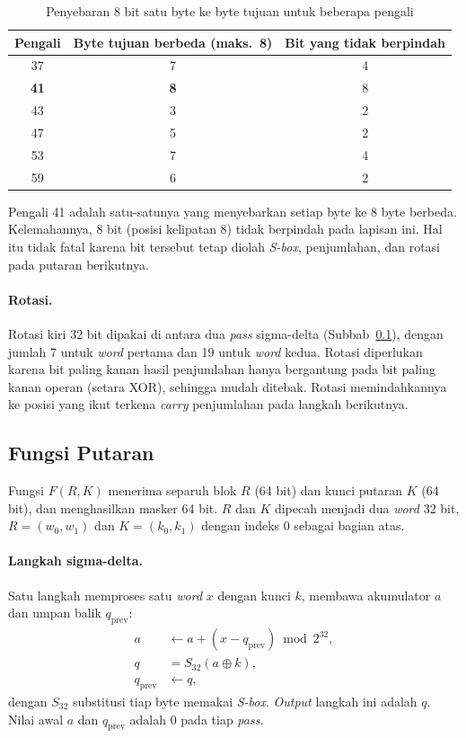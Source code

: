 \begin{table}[H]
  \centering
  \caption{Penyebaran 8 bit satu byte ke byte tujuan untuk beberapa pengali}
  \begin{tabular}{ccc}
    \toprule
    Pengali & Byte tujuan berbeda (maks.~8) & Bit yang tidak berpindah \\
    \midrule
    37 & 7 & 4 \\
    \textbf{41} & \textbf{8} & 8 \\
    43 & 3 & 2 \\
    47 & 5 & 2 \\
    53 & 7 & 4 \\
    59 & 6 & 2 \\
    \bottomrule
  \end{tabular}
\end{table}

Pengali 41 adalah satu-satunya yang menyebarkan setiap byte ke 8 byte berbeda. Kelemahannya, 8 bit
(posisi kelipatan 8) tidak berpindah pada lapisan ini. Hal itu tidak fatal karena bit tersebut
tetap diolah \textit{S-box}, penjumlahan, dan rotasi pada putaran berikutnya.

\paragraph{Rotasi.} Rotasi kiri 32 bit dipakai di antara dua \textit{pass} sigma-delta
(Subbab~\ref{sec:fungsi}), dengan jumlah 7 untuk \textit{word} pertama dan 19 untuk \textit{word} kedua.
Rotasi diperlukan karena bit paling kanan hasil penjumlahan hanya bergantung pada bit paling
kanan operan (setara XOR), sehingga mudah ditebak. Rotasi memindahkannya ke posisi yang ikut
terkena \textit{carry} penjumlahan pada langkah berikutnya.

\subsection{Fungsi Putaran}\label{sec:fungsi}
Fungsi $F(R, K)$ menerima separuh blok $R$ (64 bit) dan kunci putaran $K$ (64 bit), dan
menghasilkan masker 64 bit. $R$ dan $K$ dipecah menjadi dua \textit{word} 32 bit,
$R = (w_0, w_1)$ dan $K = (k_0, k_1)$ dengan indeks 0 sebagai bagian atas.

\paragraph{Langkah sigma-delta.} Satu langkah memproses satu \textit{word} $x$ dengan kunci $k$,
membawa akumulator $a$ dan umpan balik $q_{\text{prev}}$:
\begin{align*}
  a &\leftarrow a + (x - q_{\text{prev}}) \bmod 2^{32}, \\
  q &= S_{32}(a \oplus k), \\
  q_{\text{prev}} &\leftarrow q,
\end{align*}
dengan $S_{32}$ substitusi tiap byte memakai \textit{S-box}. \textit{Output} langkah ini adalah $q$.
Nilai awal $a$ dan $q_{\text{prev}}$ adalah 0 pada tiap \textit{pass}.


